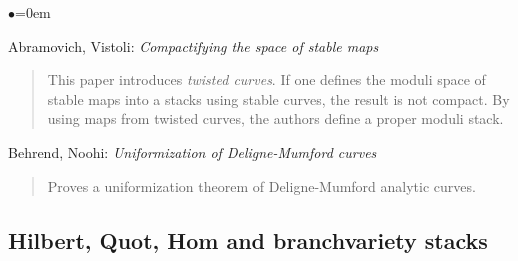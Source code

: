 \begin{list}{$\bullet$}{\leftmargin=0em}
\item Abramovich, Vistoli:  \emph{Compactifying the space of stable maps}
\cite{abramovich-vistoli}
\begin{quote}
This paper introduces \emph{twisted curves}.  If one defines the moduli
space of stable maps into a stacks using stable curves, the result is not
compact.  By using maps from twisted curves, the authors define a proper
moduli stack.
\end{quote}
\smallskip
\item Behrend, Noohi: \emph{Uniformization of Deligne-Mumford curves}
\cite{behrend-noohi}
\begin{quote}
Proves a uniformization theorem of Deligne-Mumford analytic curves.
\end{quote}
\end{list}

\subsection{Hilbert, Quot, Hom and branchvariety stacks}
\label{subsection-hilbert-quot-hom}

